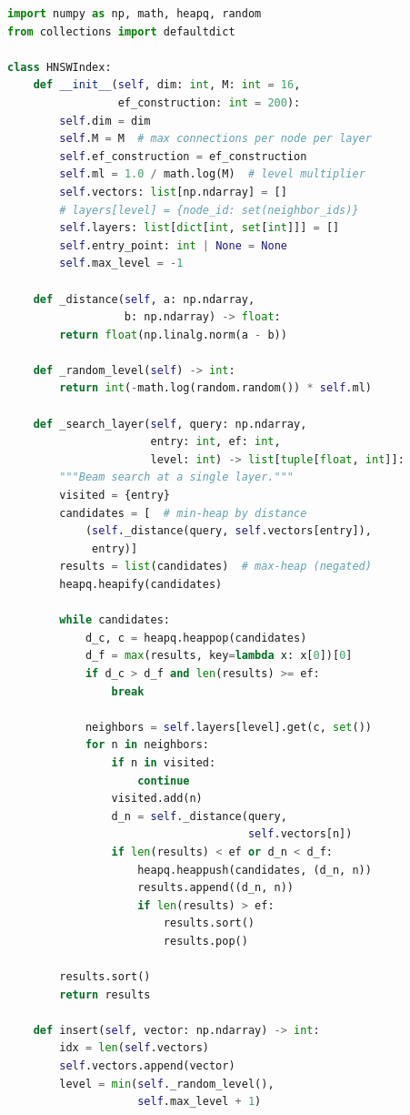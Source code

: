 \begin{lstlisting}[language=Python]
import numpy as np, math, heapq, random
from collections import defaultdict

class HNSWIndex:
    def __init__(self, dim: int, M: int = 16,
                 ef_construction: int = 200):
        self.dim = dim
        self.M = M  # max connections per node per layer
        self.ef_construction = ef_construction
        self.ml = 1.0 / math.log(M)  # level multiplier
        self.vectors: list[np.ndarray] = []
        # layers[level] = {node_id: set(neighbor_ids)}
        self.layers: list[dict[int, set[int]]] = []
        self.entry_point: int | None = None
        self.max_level = -1

    def _distance(self, a: np.ndarray,
                  b: np.ndarray) -> float:
        return float(np.linalg.norm(a - b))

    def _random_level(self) -> int:
        return int(-math.log(random.random()) * self.ml)

    def _search_layer(self, query: np.ndarray,
                      entry: int, ef: int,
                      level: int) -> list[tuple[float, int]]:
        """Beam search at a single layer."""
        visited = {entry}
        candidates = [  # min-heap by distance
            (self._distance(query, self.vectors[entry]),
             entry)]
        results = list(candidates)  # max-heap (negated)
        heapq.heapify(candidates)

        while candidates:
            d_c, c = heapq.heappop(candidates)
            d_f = max(results, key=lambda x: x[0])[0]
            if d_c > d_f and len(results) >= ef:
                break

            neighbors = self.layers[level].get(c, set())
            for n in neighbors:
                if n in visited:
                    continue
                visited.add(n)
                d_n = self._distance(query,
                                     self.vectors[n])
                if len(results) < ef or d_n < d_f:
                    heapq.heappush(candidates, (d_n, n))
                    results.append((d_n, n))
                    if len(results) > ef:
                        results.sort()
                        results.pop()

        results.sort()
        return results

    def insert(self, vector: np.ndarray) -> int:
        idx = len(self.vectors)
        self.vectors.append(vector)
        level = min(self._random_level(),
                    self.max_level + 1)


\end{lstlisting}
